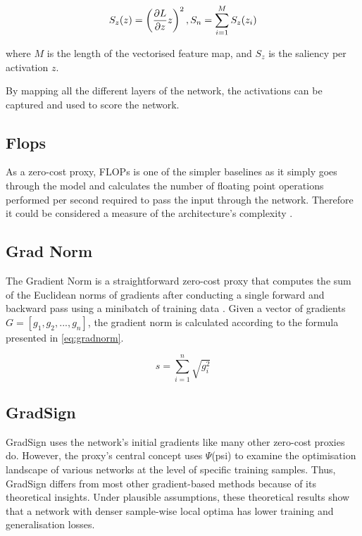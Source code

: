 \begin{equation}
    \centering
    S_z(z) = \left(\frac{\partial L}{\partial z}z\right)^2, S_n = \sum_{i=1}^M S_z(z_i)
    \label{eq:fisher}
\end{equation}

where $M$ is the length of the vectorised feature map, and  $S_z$ is the saliency per activation $z$. 

By mapping all the different layers of the network, the activations can be captured and used to score the network.  

\subsection{Flops}
As a zero-cost proxy, \Gls{FLOPs} is one of the simpler baselines as it simply goes through the model and calculates the number of floating point operations performed per second required to pass the input through the network. Therefore it could be considered a measure of the architecture's complexity \autocite{ning2021evaluating}. 

\subsection{Grad Norm}
The Gradient Norm is a straightforward zero-cost proxy that computes the sum of the Euclidean norms of gradients after conducting a single forward and backward pass using a minibatch of training data \autocite{abdelfattah2021zero}. Given a vector of gradients \(G = [g_1, g_2, ..., g_n]\), the gradient norm is calculated according to the formula presented in \cref{eq:gradnorm}.

\begin{equation}\label{eq:gradnorm}
    s = \sum_{i=1}^n \sqrt{g_i^2}
\end{equation}


\subsection{GradSign}
GradSign uses the network's initial gradients like many other zero-cost proxies do. However, the proxy's central concept uses $\Psi$(psi) to examine the optimisation landscape of various networks at the level of specific training samples. Thus, GradSign differs from most other gradient-based methods because of its theoretical insights. Under plausible assumptions, these theoretical results show that a network with denser sample-wise local optima has lower training and generalisation losses.

